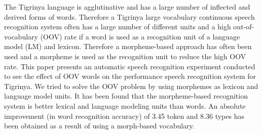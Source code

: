 The Tigrinya language is agglutinative and has a large number of inflected and derived forms of words. Therefore a Tigrinya large vocabulary continuous speech recognition system often has a large number of different units and a high out-of-vocabulary (OOV) rate if a word is used as a recognition unit of a language model (LM) and lexicon. Therefore a morpheme-based approach has often been used  and a morpheme is used as the recognition unit to reduce the high OOV rate. This paper presents an automatic speech recognition experiment conducted to see the effect of OOV words on the performance speech recognition system for Tigrinya. We tried to solve the OOV problem by using morphemes as lexicon and language model units. It has been found that the morpheme-based recognition system is better lexical and language modeling units than words. An absolute improvement (in word recognition accuracy) of 3.45 token and 8.36 types has been obtained as a result of using a morph-based vocabulary.

